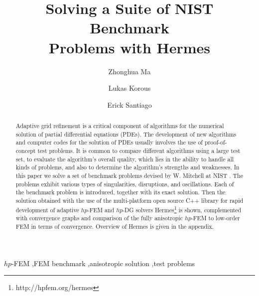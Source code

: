 \documentclass[12pt]{elsarticle}
\begin{document}
\begin{frontmatter}



\title{Solving a Suite of NIST Benchmark \\Problems with Hermes}

\author[label1]{Zhonghua Ma}
\author[label2]{Lukas Korous}
\author[label3]{Erick Santiago}
\address[label1]{China University of Petroleum, Beijing, China}
\address[label2]{Charles University, Prague, Czech Republic}
\address[label3]{University of Nevada, Reno, USA}

\begin{abstract}
Adaptive grid refinement is a critical component of algorithms for the numerical solution of partial differential equations (PDEs).
The development of new algorithms and computer
codes for the solution of PDEs usually involves the use of proof-of-concept test problems.
It is common to compare different algorithms using a large test set, to evaluate the algorithm's overall quality, which lies in the ability to handle all kinds of problems, and also to determine the algorithm's strengths and weaknesses.
In this paper we solve a set of benchmark problems devised by
W. Mitchell at NIST \cite{mitchell-1}.
The problems exhibit various types of singularities, disruptions, and oscillations.
Each of the benchmark problem is introduced, together with its exact solution.
Then the solution obtained with the use of the multi-platform open source
C++ library for rapid development of adaptive $hp$-FEM and $hp$-DG solvers {\sc Hermes}\footnote{http://hpfem.org/hermes} is shown,
complemented with convergence graphs and comparison of the fully anisotropic
$hp$-FEM to low-order FEM in terms of convergence.
Overview of Hermes is given in the appendix.
\end{abstract}

\begin{keyword}
$hp$-FEM \sep FEM benchmark \sep anisotropic solution \sep test problems
\end{keyword}

\end{frontmatter}
\end{document}
